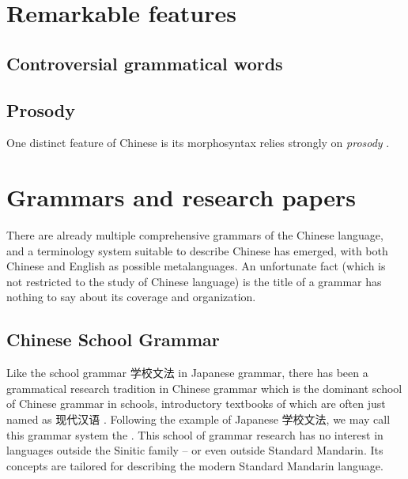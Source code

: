 \section{Remarkable features}

\subsection{Controversial grammatical words}

\subsection{Prosody}\label{sec:prosody-intro}

One distinct feature of Chinese is its morphosyntax relies strongly on \emph{prosody} \citep{feng2000}. 


\section{Grammars and research papers}

There are already multiple comprehensive grammars of the Chinese language, and a terminology system 
suitable to describe Chinese has emerged, with both Chinese and English as possible metalanguages. 
An unfortunate fact (which is not restricted to the study of Chinese language) is the title of a grammar
has nothing to say about its coverage and organization. 

\subsection{Chinese School Grammar}\label{sec:school-grammar}

Like the school grammar 学校文法 in Japanese grammar, there has been a grammatical research tradition 
in Chinese grammar which is the dominant school of Chinese grammar in schools, introductory textbooks of 
which are often just named as 现代汉语 \citep[e.g.][]{xianhan2004}. Following the example of Japanese 
学校文法, we may call this grammar system the .
This school of grammar research has no interest in languages outside the Sinitic family -- or even outside 
Standard Mandarin. Its concepts are tailored for describing the modern Standard Mandarin language. 

